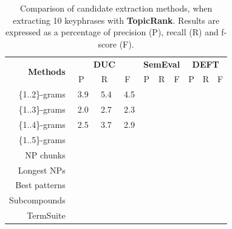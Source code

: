     \begin{table}[h]
      \centering
      \begin{tabular}{rccccccccc}
        \toprule
        \multirow{2}{*}[-2pt]{\textbf{Methods}} & \multicolumn{3}{c}{\textbf{DUC}} & \multicolumn{3}{c}{\textbf{SemEval}} & \multicolumn{3}{c}{\textbf{DEFT}}\\
        \cmidrule(r){2-4}\cmidrule(lr){5-7}\cmidrule(l){8-10}
        & P & R & F & P & R & F & P & R & F\\
        \midrule
        \{1..2\}-grams & $~~$3.9 & $~~$5.4 & $~~$4.5 & & & & & &\\
        \{1..3\}-grams & $~~$2.0 & $~~$2.7 & $~~$2.3 & & & & & &\\
        \{1..4\}-grams & $~~$2.5 & $~~$3.7 & $~~$2.9 & & & & & &\\
        \{1..5\}-grams & & & & & & & & &\\
        NP chunks & & & & & & & & &\\
        Longest NPs & & & & & & & & &\\
        Best patterns & & & & & & & & &\\
        Subcompounds & & & & & & & & &\\
        TermSuite & & & & & & & & &\\
        \bottomrule
      \end{tabular}
      \caption{Comparison of candidate extraction methods, when extracting 10
               keyphrases with \textbf{TopicRank}. Results are expressed as a
               percentage of precision (P), recall (R) and f-score (F).
               \label{tab:keyphrase_extraction_results}}
    \end{table}

